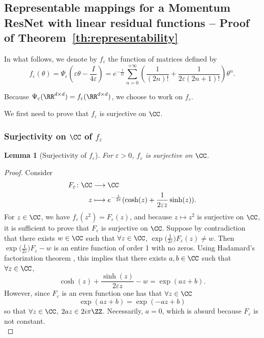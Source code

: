 \documentclass{article}
\newtheorem{lemma}{Lemma}
\begin{document}
\subsection{Representable mappings for a Momentum ResNet with linear residual functions -- Proof of Theorem~\ref{th:representability}}\label{app:th_representability}

In what follows, we denote by $f_{\varepsilon}$ the function of matrices defined by $$f_{\varepsilon}(\theta) = \Psi_{\varepsilon}(\varepsilon \theta - \frac{I}{4\varepsilon}) = e^{-\frac{1}{2\varepsilon}} \sum_{n=0}^{+\infty} \left(\frac{1}{(2n)!} + \frac{1}{2\varepsilon(2n+1)!}\right) \theta ^n.$$

Because $\Psi_{\varepsilon}(\RR^{d\times d}) = f_{\varepsilon}(\RR^{d\times d})$, we choose to work on $f_{\varepsilon}$. 


We first need to prove that $f_{\varepsilon}$ is surjective on $\CC$.

\subsubsection{Surjectivity on $\CC$ of $f_{\varepsilon}$}
\begin{lemma}[Surjectivity of $f_{\varepsilon}$]\label{lemma:surjectivity}
For $\varepsilon>0$, $f_{\varepsilon}$ is surjective on $\CC$. 
\end{lemma}

\begin{proof}
Consider
\begin{align*}
 F_{\varepsilon} \colon \CC & \longrightarrow \CC\\
z &\longmapsto e^{-\frac{1}{2 \varepsilon}}(\cosh(z) + \frac{1}{2\varepsilon z} \sinh(z)).
\end{align*}
For $z \in \CC$, we have $f_{\varepsilon}(z^2) = F_{\varepsilon}(z)$, and because $z \mapsto z^2$ is surjective on $\CC$, it is sufficient to prove that $F_{\varepsilon}$ is surjective on $\CC$.
Suppose by contradiction that there exists $w \in \CC$ such that $\forall z \in \CC$, $\exp{(\frac{1}{2 \varepsilon}})F_{\varepsilon}(z) \neq w$.
Then $\exp{(\frac{1}{2 \varepsilon}})F_{\varepsilon} -w $ is an entire function  \cite{levin1996lectures} of order 1 with no zeros. Using Hadamard's factorization theorem \cite{conway2012functions}, this implies that there exists $a, b \in \CC$ such that $\forall z \in \CC$, 
$$
\cosh(z) + \frac{\sinh(z)}{2\varepsilon z} - w = \exp{(az +b).}
$$
However, since $F_{\varepsilon}$ is an even function one has that $\forall z \in \CC$ 
$$
\exp{(az +b)} = \exp{(-az +b)}
$$
so that $\forall z \in \CC$, $2az \in 2i\pi\ZZ$. Necessarily, $a = 0$, which is absurd because $F_{\varepsilon}$ is not constant.\\
\end{proof}
\end{document}

